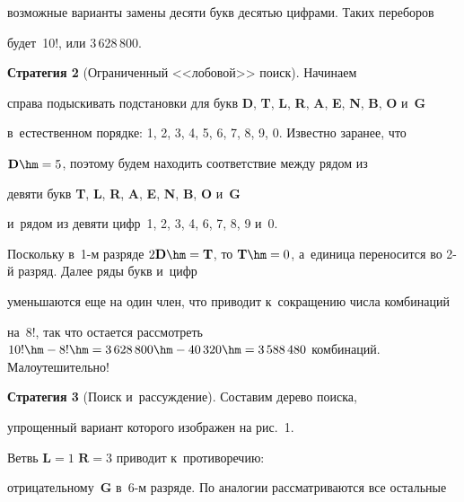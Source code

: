 возможные варианты замены десяти букв десятью цифрами. Таких переборов 


будет~10!, или 3\,628\,800.


    


    \smallskip


    


    \textbf{Стратегия 2} (Ограниченный <<лобовой>> поиск). Начинаем 


справа подыскивать подстановки для букв \textbf{D}, \textbf{T}, \textbf{L}, \textbf{R}, \textbf{A}, \textbf{E}, \textbf{N}, \textbf{B}, \textbf{O} и~\textbf{G} 


в~естественном порядке: 1, 2, 3, 4, 5, 6, 7, 8, 9, 0. Известно заранее, что 


$\mathbf{D} \hm= 5$, поэтому будем находить соответствие между рядом из 


девяти букв \textbf{T}, \textbf{L}, \textbf{R}, \textbf{A}, \textbf{E}, \textbf{N}, \textbf{B}, \textbf{O} и~\textbf{G} 


и~рядом из девяти цифр~1, 2, 3, 4, 6, 7, 8, 9 и~0. 


    


    Поскольку в~1-м разряде $2\mathbf{D}\hm = \mathbf{T}$, то $\mathbf{T}


    \hm = 0$, а~единица переносится во 2-й разряд. Далее ряды букв и~цифр 


уменьшаются еще на один член, что приводит к~сокращению числа комбинаций 


на~8!, так что остается рассмотреть $10! \hm- 8! \hm= 3\,628\,800 \hm- 40\,320 


\hm= 3\,588\,480$ комбинаций. Малоутешительно! 


    


    \smallskip


    


    \textbf{Стратегия 3} (Поиск и~рассуждение). Составим дерево поиска, 


упрощенный вариант которого изображен на рис.~1. 


    


    Ветвь $\mathbf{L} = 1$ $\mathbf{R} = 3$ приводит к~противоречию: 


отрицательному~\textbf{G} в~\mbox{6-м} разряде. По аналогии рассматриваются все остальные 


